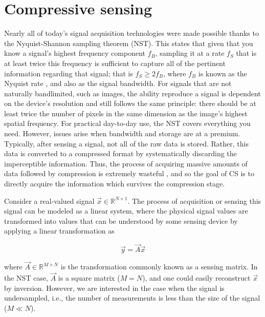 \section{Compressive sensing}
\label{sec:cs}

Nearly all of today's signal acquisition technologies were made possible thanks to the Nyquist-Shannon sampling theorem (NST). This states that given that you know a signal's highest frequency component $f_B$, sampling it at a rate $f_S$ that is at least twice this frequency is sufficient to capture all of the pertinent information regarding that signal; that is $f_S \geq 2f_B$, where $f_B$ is known as the Nyquist rate \cite{Shannon1949}, and also as the signal bandwidth. For signals that are not naturally bandlimited, such as images, the ability reproduce a signal is dependent on the device's resolution and still follows the same principle: there should be at least twice the number of pixels in the same dimension as the image's highest spatial frequency. For practical day-to-day use, the NST covers everything you need. However, issues arise when bandwidth and storage are at a premium. Typically, after sensing a signal, not all of the raw data is stored. Rather, this data is converted to a compressed format by systematically discarding the imperceptible information. Thus, the process of acquiring massive amounts of data followed by compression is extremely wasteful \cite{Candes2008b}, and so the goal of CS is to directly acquire the information which survives the compression stage.

Consider a real-valued signal $\vec{x} \in \mathbb{R}^{N \times 1}$. The process of acquisition or sensing this signal can be modeled as a linear system, where the physical signal values are transformed into values that can be understood by some sensing device by applying a linear transformation as

\begin{equation}\label{eq:cesa}
    \vec{y} = \vec{A}\vec{x}
\end{equation}

\noindent where $\vec{A} \in \mathbb{R}^{M \times N}$ is the transformation commonly known as a sensing matrix. In the NST case, $\vec{A}$ is a square matrix ($M = N$), and one could easily reconstruct $\vec{x}$ by inversion. However, we are interested in the case when the signal is undersampled, i.e., the number of measurements is less than the size of the signal ($M \ll N$).